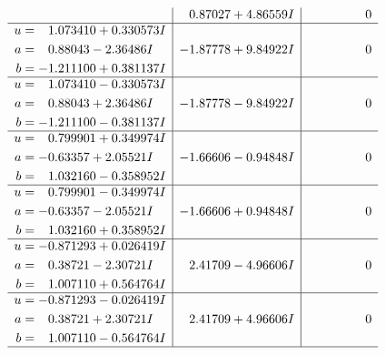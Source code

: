 \documentclass[1p]{elsarticle_modified}
\theoremstyle{definition}
\begin{document}
$$\begin{array}{c|c|c}
 & \phantom{-}0.87027 + 4.86559 I & \phantom{-0.000000 } 0 \\ \hline\begin{aligned}
u &= \phantom{-}1.073410 + 0.330573 I \\
a &= \phantom{-}0.88043 - 2.36486 I \\
b &= -1.211100 + 0.381137 I\end{aligned}
 & -1.87778 + 9.84922 I & \phantom{-0.000000 } 0 \\ \hline\begin{aligned}
u &= \phantom{-}1.073410 - 0.330573 I \\
a &= \phantom{-}0.88043 + 2.36486 I \\
b &= -1.211100 - 0.381137 I\end{aligned}
 & -1.87778 - 9.84922 I & \phantom{-0.000000 } 0 \\ \hline\begin{aligned}
u &= \phantom{-}0.799901 + 0.349974 I \\
a &= -0.63357 + 2.05521 I \\
b &= \phantom{-}1.032160 - 0.358952 I\end{aligned}
 & -1.66606 - 0.94848 I & \phantom{-0.000000 } 0 \\ \hline\begin{aligned}
u &= \phantom{-}0.799901 - 0.349974 I \\
a &= -0.63357 - 2.05521 I \\
b &= \phantom{-}1.032160 + 0.358952 I\end{aligned}
 & -1.66606 + 0.94848 I & \phantom{-0.000000 } 0 \\ \hline\begin{aligned}
u &= -0.871293 + 0.026419 I \\
a &= \phantom{-}0.38721 - 2.30721 I \\
b &= \phantom{-}1.007110 + 0.564764 I\end{aligned}
 & \phantom{-}2.41709 - 4.96606 I & \phantom{-0.000000 } 0 \\ \hline\begin{aligned}
u &= -0.871293 - 0.026419 I \\
a &= \phantom{-}0.38721 + 2.30721 I \\
b &= \phantom{-}1.007110 - 0.564764 I\end{aligned}
 & \phantom{-}2.41709 + 4.96606 I & \phantom{-0.000000 } 0\\
 \hline 
 \end{array}$$\newpage$$\begin{array}{c|c|c}  

\end{array}$$
\end{document}
